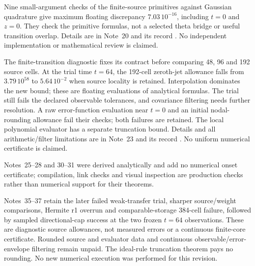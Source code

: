 Nine small-argument checks of the finite-source primitives against
Gaussian quadrature give maximum floating discrepancy
$7.03\,10^{-16}$, including $t=0$ and $z=0$.
They check the primitive formulas, not a selected theta bridge or useful
transition overlap. Details are in Note~20 and its record
\cite{n20,primitiverecord}. No independent implementation or mathematical
review is claimed.

The finite-transition diagnostic fixes its contract before comparing
48, 96 and 192 source cells. At the trial time $t=64$, the 192-cell
zeroth-jet allowance falls from $3.79\,10^{58}$ to $5.64\,10^{-2}$
when source locality is retained. Interpolation dominates the new bound;
these are floating evaluations of analytical formulas. The trial still
fails the declared observable tolerances, and covariance filtering needs
further resolution. A raw error-function evaluation near $t=0$ and an
initial nodal-rounding allowance fail their checks; both failures are
retained. The local polynomial evaluator has a separate truncation bound.
Details and all arithmetic/filter limitations are in Note~23 and its
record \cite{n23,localrecord}. No uniform numerical certificate is claimed.

Notes~25--28 and 30--31 were derived analytically and add no numerical
onset certificate; compilation, link checks and visual inspection are
production checks rather than numerical support for their theorems.

Notes~35--37 \cite{n35,n36,n37} retain the later failed weak-transfer trial,
sharper source/weight comparisons, Hermite r1 overrun and comparable-storage
384-cell failure, followed by sampled directional-cap success at the two
frozen $t=64$ observations. These are diagnostic source allowances, not
measured errors or a continuous finite-core certificate. Rounded source
and evaluator data and continuous observable/error-envelope filtering
remain unpaid. The ideal-rule truncation theorem pays no rounding.
No new numerical execution was performed for this revision.

